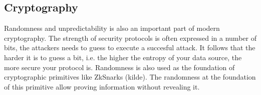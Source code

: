 \subsection{Cryptography}\label{subsec:usecase_cryptography}
Randomness and unpredictability is also an important part of modern cryptography. The strength of security protocols is often expressed in a number of bits, the attackers needs to guess to execute a succesful attack. It follows that the harder it is to guess a bit, i.e. the higher the entropy of your data source, the more secure your protocol is. 
Randomness is also used as the foundation of cryptographic primitives like ZkSnarks (kilde). The randomness at the foundation of this primitive allow proving information without revealing it.  
